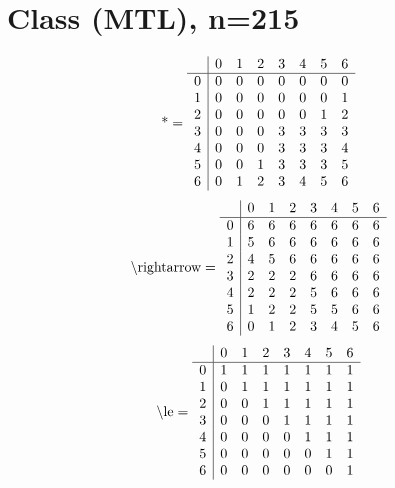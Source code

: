 \documentclass[11pt]{article}
\begin{document}
\section{Class (MTL), n=215}
\[\text{*} = 
\begin{array}{r | r r r r r r r}
 & 0 & 1 & 2 & 3 & 4 & 5 & 6 \\ \hline
0 & 0 & 0 & 0 & 0 & 0 & 0 & 0 \\
1 & 0 & 0 & 0 & 0 & 0 & 0 & 1 \\
2 & 0 & 0 & 0 & 0 & 0 & 1 & 2 \\
3 & 0 & 0 & 0 & 3 & 3 & 3 & 3 \\
4 & 0 & 0 & 0 & 3 & 3 & 3 & 4 \\
5 & 0 & 0 & 1 & 3 & 3 & 3 & 5 \\
6 & 0 & 1 & 2 & 3 & 4 & 5 & 6 \\
\end{array}
\]
\[\text{\textbackslash rightarrow} = 
\begin{array}{r | r r r r r r r}
 & 0 & 1 & 2 & 3 & 4 & 5 & 6 \\ \hline
0 & 6 & 6 & 6 & 6 & 6 & 6 & 6 \\
1 & 5 & 6 & 6 & 6 & 6 & 6 & 6 \\
2 & 4 & 5 & 6 & 6 & 6 & 6 & 6 \\
3 & 2 & 2 & 2 & 6 & 6 & 6 & 6 \\
4 & 2 & 2 & 2 & 5 & 6 & 6 & 6 \\
5 & 1 & 2 & 2 & 5 & 5 & 6 & 6 \\
6 & 0 & 1 & 2 & 3 & 4 & 5 & 6 \\
\end{array}
\]
\[\text{\textbackslash le} = 
\begin{array}{r | r r r r r r r}
 & 0 & 1 & 2 & 3 & 4 & 5 & 6 \\ \hline
0 & 1 & 1 & 1 & 1 & 1 & 1 & 1 \\
1 & 0 & 1 & 1 & 1 & 1 & 1 & 1 \\
2 & 0 & 0 & 1 & 1 & 1 & 1 & 1 \\
3 & 0 & 0 & 0 & 1 & 1 & 1 & 1 \\
4 & 0 & 0 & 0 & 0 & 1 & 1 & 1 \\
5 & 0 & 0 & 0 & 0 & 0 & 1 & 1 \\
6 & 0 & 0 & 0 & 0 & 0 & 0 & 1 \\
\end{array}
\]
\end{document}
